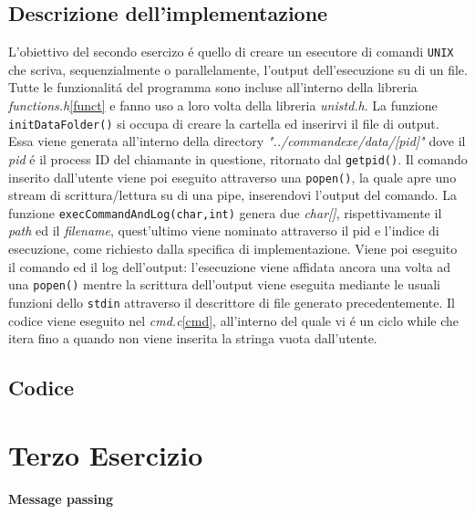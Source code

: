 \documentclass[a4paper]{article}
\begin{document}
\subsection{Descrizione dell'implementazione}
L'obiettivo del secondo esercizo \'e quello di creare un esecutore di comandi \texttt{UNIX} che scriva, sequenzialmente o parallelamente, l'output dell'esecuzione su di un file. \\
Tutte le funzionalit\'a del programma sono incluse all'interno della libreria \textit{functions.h}\ref{funct} e fanno uso a loro volta della libreria \textit{unistd.h}.
La funzione \texttt{initDataFolder()} si occupa di creare la cartella ed inserirvi il file di output. Essa viene generata all'interno della directory \textit{"../commandexe/data/[pid]"} dove il \textit{pid} \'e il process ID del chiamante in questione, ritornato dal \texttt{getpid()}.
Il comando inserito dall'utente viene poi eseguito attraverso una \texttt{popen()}, la quale apre uno stream di scrittura/lettura su di una pipe, inserendovi l'output del comando.
La funzione \texttt{execCommandAndLog(char,int)} genera due \textit{char[]}, rispettivamente il \textit{path} ed il \textit{filename}, quest'ultimo viene nominato attraverso il pid e l'indice di esecuzione, come richiesto dalla specifica di implementazione.
Viene poi eseguito il comando ed il log dell'output: l'esecuzione viene affidata ancora una volta ad una \texttt{popen()} mentre la scrittura dell'output viene eseguita mediante le usuali funzioni dello \texttt{stdin} attraverso il descrittore di file generato precedentemente.
Il codice viene eseguito nel \textit{cmd.c}\ref{cmd}, all'interno del quale vi \'e un ciclo while che itera fino a quando non viene inserita la stringa vuota dall'utente.

\subsection{Codice}



\newpage
\section{Terzo Esercizio}
\textbf{Message passing}
\end{document}
